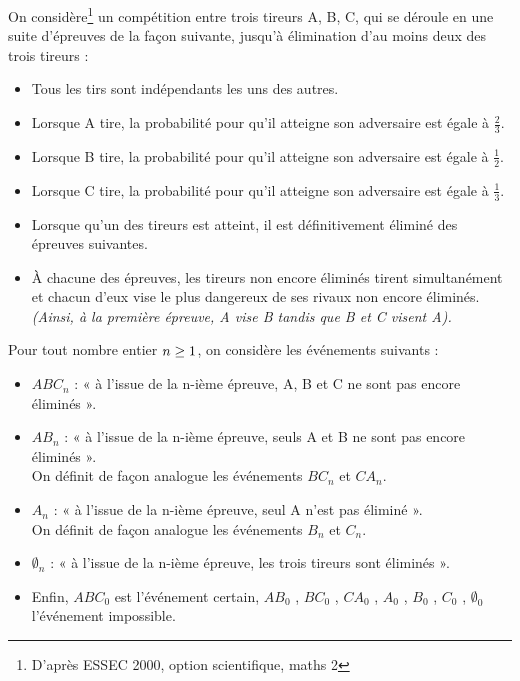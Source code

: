 On considère\footnote{D'après ESSEC 2000, option scientifique, maths 2}  un compétition entre trois tireurs A, B, C, qui se déroule en une suite d'épreuves de la façon
suivante, jusqu'à élimination d'au moins deux des trois tireurs :
\begin{itemize}
\item Tous les tirs sont indépendants les uns des autres.
\item Lorsque A tire, la probabilité pour qu'il atteigne son adversaire est égale à $\frac 23$.
\item Lorsque B tire, la probabilité pour qu'il atteigne son adversaire est égale à $\frac 12$.
\item Lorsque C tire, la probabilité pour qu'il atteigne son adversaire est égale à $\frac 13$.
\item Lorsque qu'un des tireurs est atteint, il est définitivement éliminé des épreuves suivantes.
\item À chacune des épreuves, les tireurs non encore éliminés tirent simultanément et chacun d'eux vise le plus dangereux de ses rivaux non encore éliminés.\\
\textit{(Ainsi, à la première épreuve, A vise B tandis que B et C visent A).}

\end{itemize}
\vspace{0.3cm}
Pour tout nombre entier $n \geq 1$, on considère les événements suivants :
\begin{itemize}
\item $ABC_n$ : « à l'issue de la n-ième épreuve, A, B et C ne sont pas encore éliminés ».
\item $AB_n$ : « à l'issue de la n-ième épreuve, seuls A et B ne sont pas encore éliminés ».\\
On définit de façon analogue les événements $BC_n$ et $CA_n$.
\item $A_n$ : « à l'issue de la n-ième épreuve, seul A n'est pas éliminé ».\\
On définit de façon analogue les événements $B_n$ et $C_n$.
\item $\emptyset_n$ : « à l'issue de la n-ième épreuve, les trois tireurs sont éliminés ».
\item Enfin, $ABC_0$ est l'événement certain, $AB_0$ , $BC_0$ , $CA_0$ , $A_0$ , $B_0$ , $C_0$ , $\emptyset_0$ l'événement impossible.
\end{itemize}

